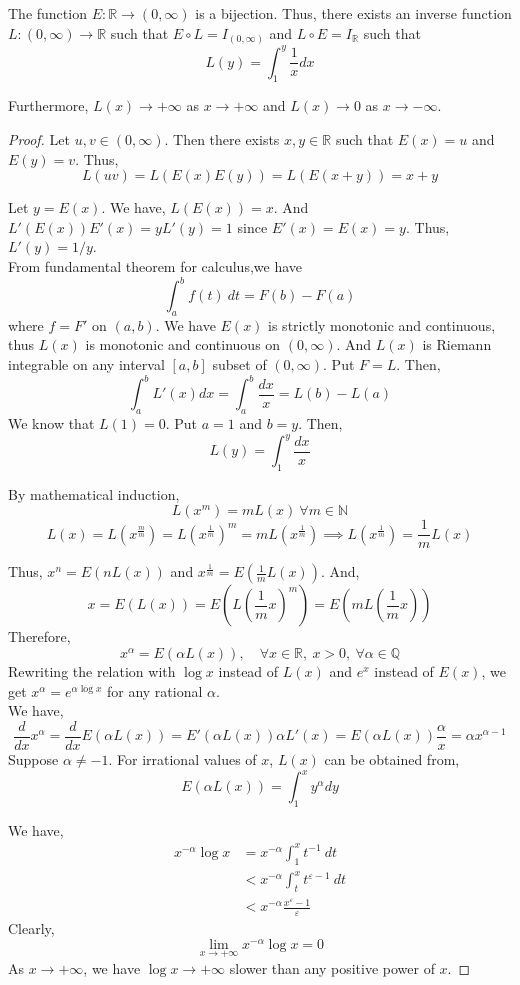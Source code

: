 \begin{remark}
	The function $E : \mathbb{R} \to (0,\infty)$ is a bijection.
	Thus, there exists an inverse function $L : (0,\infty) \to \mathbb{R}$ such that $E \circ L = I_{(0,\infty)}$ and $L \circ E = I_\mathbb{R}$ such that 
	\[ L(y) = \int_1^y \frac{1}{x} dx \]
	
	Furthermore, $L(x) \to +\infty$ as $x \to +\infty$ and $L(x) \to 0$ as $x \to -\infty$.
\end{remark}
\begin{proof}
	Let $u,v \in (0,\infty)$.
	Then there exists $x,y \in \mathbb{R}$ such that $E(x) = u$ and $E(y) = v$.
	Thus,
	\[ L(uv) = L(E(x)E(y)) = L(E(x+y)) = x+y \]

	Let $y = E(x)$.
	We have, $L(E(x)) = x$.
	And $L'(E(x)) E'(x) = yL'(y) = 1$ since $E'(x) = E(x) = y$.
	Thus, $L'(y) = 1/y$.\\

	From fundamental theorem for calculus,we have
	\[ \int_a^b f(t)\ dt = F(b) - F(a) \]
	where $f = F'$ on $(a,b)$.
	We have $E(x)$ is strictly monotonic and continuous, thus $L(x)$ is monotonic and continuous on $(0,\infty)$.
	And $L(x)$ is Riemann integrable on any interval $[a,b]$ subset of $(0,\infty)$.
	Put $F = L$.
	Then,
	\[ \int_a^b L'(x) dx = \int_a^b \frac{dx}{x} = L(b) - L(a) \]
	We know that $L(1) = 0$.
	Put $a = 1$  and $b = y$.
	Then, \[ L(y) = \int_1^y \frac{dx}{x} \]

	By mathematical induction,
	\[ L(x^m) = mL(x) \ \forall m \in \mathbb{N} \]
	\[ L(x) = L(x^\frac{m}{m}) = L(x^\frac{1}{m})^m = mL(x^\frac{1}{m}) \implies L(x^\frac{1}{m}) = \frac{1}{m}L(x) \]

	Thus, $x^n = E(nL(x))$ and $x^\frac{1}{m} = E(\frac{1}{m}L(x))$.
	And,
	\[ x = E(L(x)) = E(L(\frac{1}{m}x)^m) = E(mL(\frac{1}{m}x))\]
	Therefore,
	\[ x^\alpha = E(\alpha L(x)),\quad \forall x \in \mathbb{R},\ x > 0,\  \forall \alpha \in \mathbb{Q} \]
	Rewriting the relation with $\log x$ instead of $L(x)$ and $e^x$ instead of $E(x)$, we get $x^\alpha = e^{\alpha \log x}$ for any rational $\alpha$.\\

	We have,
	\[ \frac{d}{dx}x^\alpha = \frac{d}{dx} E(\alpha L(x)) = E'(\alpha L(x)) \alpha L'(x) = E(\alpha L(x)) \frac{\alpha}{x} = \alpha x^{\alpha - 1} \]
	Suppose $\alpha \ne -1$.
	For irrational values of $x$, $L(x)$ can be obtained from,
	\[ E(\alpha L(x)) = \int_1^x y^\alpha dy \]

	We have,
	\begin{align*}
		x^{-\alpha}\log x & = x^{-\alpha} \int_1^x t^{-1}\ dt \\
		& < x^{-\alpha} \int_t^x t^{\varepsilon-1}\ dt \\
		& < x^{-\alpha} \frac{x^\varepsilon -1}{\varepsilon}
	\end{align*}
	Clearly, 
	\[ \lim_{x \to +\infty} x^{-\alpha} \log x  = 0 \]
	As $x \to +\infty$, we have $\log x \to +\infty$ slower than any positive power of $x$.
\end{proof}


